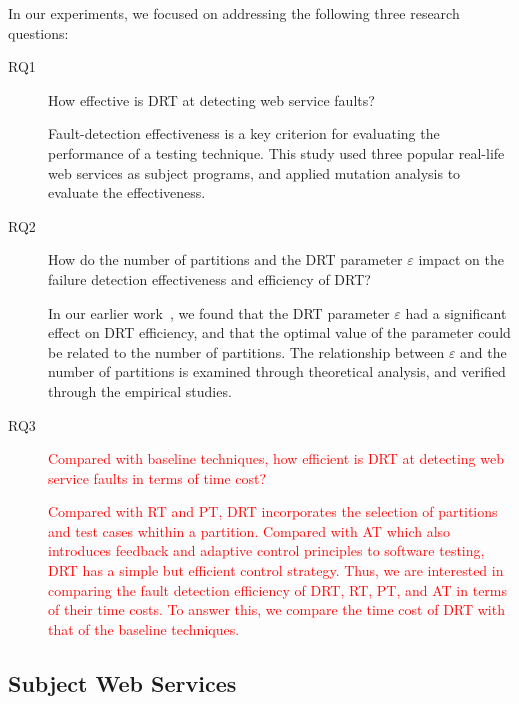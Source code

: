 \documentclass[10pt,journal,compsoc]{IEEEtran}
\begin{document}
In our experiments, we focused on addressing the following three research questions:

\begin{description}
  \item [RQ1] How effective is DRT at detecting web service faults?

  Fault-detection effectiveness is a key criterion for evaluating the performance of a testing technique.
  This study used three popular real-life web services as subject programs, and applied mutation analysis to evaluate the effectiveness.

  \item [RQ2] How do the number of partitions and the DRT parameter $\varepsilon$ impact on the failure detection effectiveness and efficiency of DRT?

  In our earlier work~\cite{sun2012towards}, we found that the DRT parameter $\varepsilon$ had a significant effect on DRT efficiency, and  that the optimal value of the parameter could be related to the number of partitions.
  The relationship between $\varepsilon$ and the number of partitions is examined through theoretical analysis, and verified through the empirical studies.

  \item [RQ3]

  \textcolor{red}{Compared with baseline techniques, how efficient is DRT at detecting web service faults in terms of time cost?}

  \textcolor{red}{Compared with RT and PT, DRT incorporates the selection of partitions and test cases whithin a partition. Compared with AT which also introduces feedback and adaptive control principles to software testing, DRT has a simple but efficient control strategy. Thus, we are interested in comparing the fault detection efficiency of DRT, RT, PT, and AT in terms of their time costs. To answer this, we compare the time cost of DRT with that of the baseline techniques.}


\end{description}

\subsection{Subject Web Services}
\label{sec:subjects}
\end{document}

